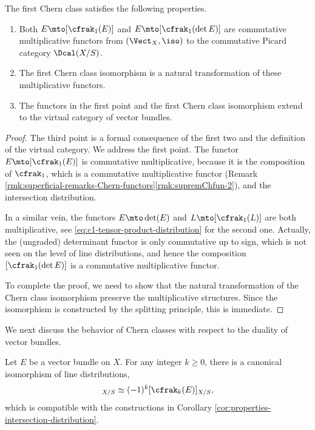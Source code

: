 \begin{proposition}\label{prop:isom-first-chern-functorial}
The first Chern class satisfies the following properties.

\begin{enumerate}
\item Both $E\mto [\cfrak_{1}(E)]$ and $E\mto [\cfrak_{1}(\det E)]$ are commutative multiplicative functors from $(\Vect_{X},\iso)$ to the commutative Picard category $\Dcal(X/S)$.
\item The first Chern class isomorphism is a natural transformation of these multiplicative functors.
\item The functors in the first point and the first Chern class isomorphism extend to the virtual category of vector bundles.
\end{enumerate}
\end{proposition}

\begin{proof}
The third point is a formal consequence of the first two and the definition of the virtual category. We address the first point. The functor $E\mto [\cfrak_{1}(E)]$ is commutative multiplicative, because it is the composition of $\cfrak_{1}$, which is a commutative multiplicative functor (\cf Remark \ref{rmk:superficial-remarks-Chern-functors}\eqref{rmk:supremChfun-2}), and the intersection distribution.

In a similar vein, the functors $E \mto \det (E)$ and $L \mto [\cfrak_1(L)]$ are both multiplicative, see \eqref{eq:c1-tensor-product-distribution} for the second one. Actually, the (ungraded) determinant functor is only commutative up to sign, which is not seen on the level of line distributions, and hence the composition $[\cfrak_1(\det E)]$ is a commutative multiplicative functor.

To complete the proof, we need to show that the natural transformation of the Chern class isomorphism preserve the multiplicative structures. Since the isomorphism is constructed by the splitting principle, this is immediate.
\end{proof}

We next discuss the behavior of Chern classes with respect to the duality of vector bundles.

\begin{proposition} \label{prop:Cherndual}
Let $E$ be a vector bundle on $X$. For any integer $k\geq 0$, there is a canonical isomorphism of line distributions,
\begin{displaymath}
[\cfrak_k(E^\vee)]_{X/S} \simeq {(-1)^k} [ \cfrak_k(E) ]_{X/S},
\end{displaymath}
which is compatible with the constructions in Corollary \ref{cor:properties-intersection-distribution}.
\end{proposition}

